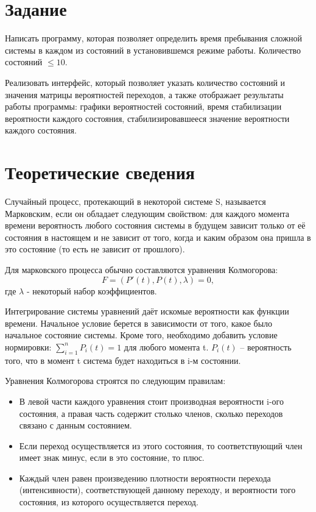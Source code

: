 \documentclass[14pt, a4paper]{extarticle}
\begin{document}


\setcounter{page}{2}

\section{Задание}
Написать программу, которая позволяет определить время пребывания сложной системы в каждом из состояний в установившемся режиме работы. Количество состояний $\le 10$.

Реализовать интерфейс, который позволяет указать количество состояний и значения матрицы вероятностей переходов, а также отображает результаты работы программы: графики вероятностей состояний, время стабилизации вероятности каждого состояния, стабилизировавшееся значение вероятности каждого состояния.

\section{Теоретические сведения}

Случайный процесс, протекающий в некоторой системе S, называется Марковским, если он обладает следующим свойством: для каждого момента времени вероятность любого состояния системы в будущем зависит только от её состояния в настоящем и не зависит от того, когда и каким образом она пришла в это состояние (то есть не зависит от прошлого).

Для марковского процесса обычно составляются уравнения Колмогорова: 
\begin{equation*}
	F = (P'(t), P(t), \lambda) = 0,
\end{equation*}где $\lambda$ - некоторый набор коэффициентов.

Интегрирование системы уравнений даёт искомые вероятности как функции времени. Начальное условие берется в зависимости от того, какое было начальное состояние системы. Кроме того, необходимо добавить условие нормировки: $\sum^{n}_{i=1}{P_i}(t) = 1$ для любого момента t. $P_i(t)$ -- вероятность того, что в момент t система будет находиться в i-м состоянии.

Уравнения Колмогорова строятся по следующим правилам:
\begin{itemize}
	\item В левой части каждого уравнения стоит производная вероятности i-ого состояния, а правая часть содержит столько членов, сколько переходов связано с данным состоянием. 
	
	\item Если переход осуществляется из этого состояния, то соответствующий член имеет знак минус, если в это состояние, то плюс. 
	
	\item Каждый член равен произведению плотности вероятности перехода (интенсивности), соответствующей данному переходу, и вероятности того состояния, из которого осуществляется переход.
\end{itemize}
\end{document}
